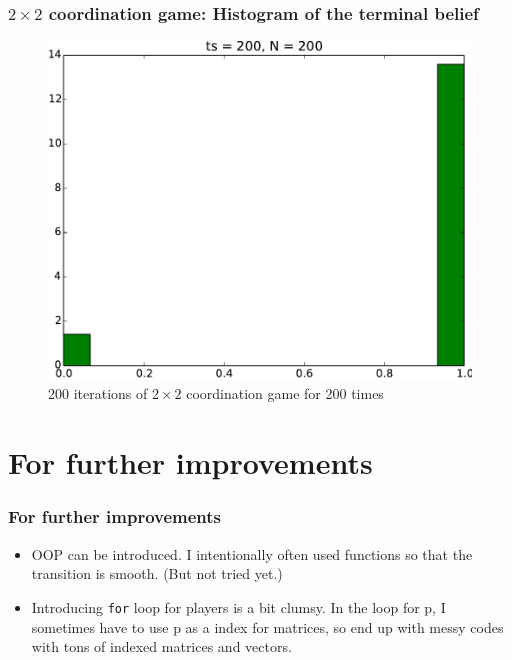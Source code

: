 \documentclass[dvipdfmx,fleqn]{beamer}
\begin{document}
\begin{frame}
\frametitle{$2\times2$ coordination game: Histogram of the terminal belief}
\begin{figure}
 \centering
 \includegraphics[width=0.7\linewidth]{2coordgame_hist200_200.pdf}
 \caption{200 iterations of $2\times2$ coordination game for 200 times}
 \label{fig:2coordgame_hist200_200}
\end{figure}
\end{frame}


\section{For further improvements}
\begin{frame}
\frametitle{For further improvements}
\begin{itemize}\setlength{\parskip}{0.5em}
\item
OOP can be introduced. I intentionally often used functions so that the transition is smooth. (But not tried yet.)

\item
Introducing \texttt{for} loop for players is a bit clumsy. In the loop for p, I sometimes have to use p as a index for matrices, so end up with messy codes with tons of indexed matrices and vectors. 

\end{itemize}
\end{frame}
\end{document}

